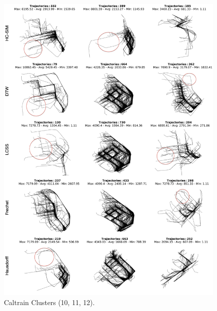 \documentclass[a4paper, 12pt]{article}
\begin{document}
\begin{figure}[htbp!]
    \centering
    \includegraphics[width=1\textwidth]{Caltrain 4.png}
    \caption{Caltrain Clusters (10, 11, 12).}
    \label{fig43}
\end{figure}
\end{document}
